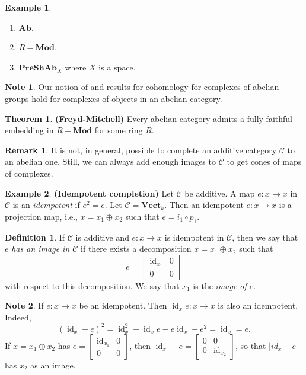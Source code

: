 \documentclass[10pt,letterpaper,cm]{nupset}
\theoremstyle{definition}
\newtheorem*{definition}{Definition}
\newtheorem{exmp}{Example}
\newtheorem{note}{Note}
\newtheorem{remark}{Remark}
\newtheorem{theorem}{Theorem}
\newcommand{\1}{\mathbf{1}}
\renewcommand{\c}{\mathscr{C}}
\newcommand{\0}{\vec 0}
\DeclareMathOperator{\id}{id}
\begin{document}
\begin{exmp} $ $
\begin{enumerate}
\item $\mathbf{Ab}$.
\item $R{-}\mathbf{Mod}$.
\item $\mathbf{PreShAb}_X$ where $X$ is a space.
\end{enumerate}
\end{exmp}

\begin{note}
Our notion of and results for cohomology for complexes of abelian groups hold for complexes of objects in an abelian category.
\end{note}

\begin{theorem}{\textbf{(Freyd-Mitchell)}}
Every abelian  category admits a fully faithful embedding in $R{-}\mathbf{Mod}$ for some ring $R$.
\end{theorem}

\begin{remark}
It is not, in general, possible to complete an additive category $\c$ to an abelian one. Still, we can always add enough images to $\c$ to get cones of maps of complexes.
\end{remark}

\begin{exmp}{\textbf{(Idempotent completion)}}
Let $\c$ be additive. A map $e: x\to x$ in $\c$ is an \textit{idempotent} if $e^2=e$. Let $\c= \mathbf{Vect}_k$. Then an idempotent $e : x \to x$ is a projection map, i.e., $x = x_1 \oplus x_2$ such that $e = i_1 \circ p_1$.
\end{exmp}

\begin{definition}
If $\c$ is additive and $e: x \to x$ is idempotent in $\c$, then we say that $e$ \textit{has an image in $\c$} if there exists a decomposition $x = x_1 \oplus x_2$ such that $$e = \begin{bmatrix} \id_{x_1} & 0 \\ 0 & 0   \end{bmatrix}    $$ with respect to this decomposition. We say that $x_1$ is the \textit{image of $e$}.
\end{definition}

\begin{note}
If $e : x \to x$ be an idempotent. Then $\id_{x}{e} : x \to x$ is also an idempotent. Indeed, $$ (\id_x - e)^2 = \id_x^2 - \id_x{e} - e {\id_x} + e^2 = \id_x = e   .$$ If $x = x_1 \oplus x_2$ has $e = \begin{bmatrix}  \id_{x_1} & 0 \\ 0 & 0 \end{bmatrix}$, then $\id_x - e = \begin{bmatrix}  0 & 0 \\ 0 & \id_{x_2} \end{bmatrix}$, so that $|id_x - e$ has $x_2$ as an image.
\end{note}
\end{document}
